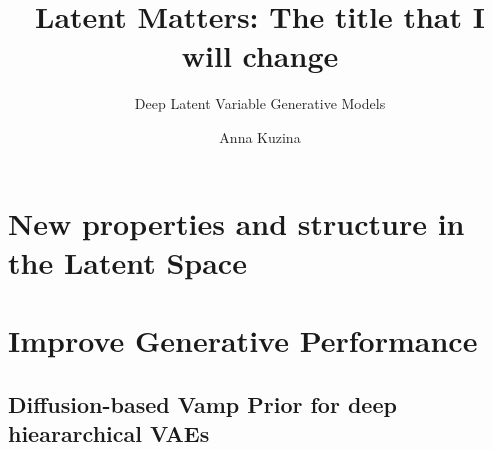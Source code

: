 \documentclass[nobib,justified,titlepage,nofonts,a4paper]{tufte-book}
\author[Anna Kuzina]{Anna Kuzina}
\title{Latent Matters: The title that I will change}
\subtitle{Deep Latent Variable Generative Models}
\begin{document}
\frontmatter
\maketitlepage
\pagestyle{plain}
%
%


\mainmatter


% 

\listoftodos[Notes]

\part{New properties and structure in the Latent Space}







\part{Improve Generative Performance}

\chapter{Diffusion-based Vamp  Prior for deep hieararchical VAEs}\label{chap:dvp}


\cleardoublepage
\begin{fullwidth}
\begin{singlespace}
	
	
\end{singlespace}
\end{fullwidth}

\appendix
\newpage
{}





\clearpage
\end{document}
